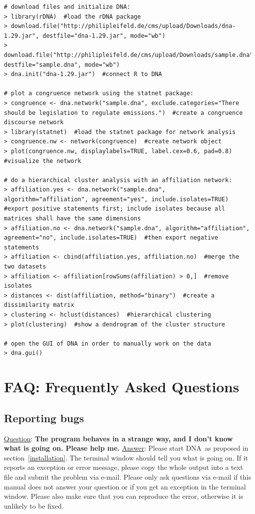 \documentclass[12pt,a4paper]{scrreprt}
\newcommand{\dnashort}{\textsc{DNA}}
\begin{document}
\begin{lstlisting}[breaklines=true,showstringspaces=false,frame=tlRB]
# download files and initialize DNA:
> library(rDNA)  #load the rDNA package
> download.file("http://philipleifeld.de/cms/upload/Downloads/dna-1.29.jar", destfile="dna-1.29.jar", mode="wb")
> download.file("http://philipleifeld.de/cms/upload/Downloads/sample.dna", destfile="sample.dna", mode="wb")
> dna.init("dna-1.29.jar")  #connect R to DNA

# plot a congruence network using the statnet package:
> congruence <- dna.network("sample.dna", exclude.categories="There should be legislation to regulate emissions.")  #create a congruence discourse network
> library(statnet)  #load the statnet package for network analysis
> congruence.nw <- network(congruence)  #create network object
> plot(congruence.nw, displaylabels=TRUE, label.cex=0.6, pad=0.8)  #visualize the network

# do a hierarchical cluster analysis with an affiliation network:
> affiliation.yes <- dna.network("sample.dna", algorithm="affiliation", agreement="yes", include.isolates=TRUE)  #export positive statements first; include isolates because all matrices shall have the same dimensions
> affiliation.no <- dna.network("sample.dna", algorithm="affiliation", agreement="no", include.isolates=TRUE)  #then export negative statements
> affiliation <- cbind(affiliation.yes, affiliation.no)  #merge the two datasets
> affiliation <- affiliation[rowSums(affiliation) > 0,]  #remove isolates
> distances <- dist(affiliation, method="binary")  #create a dissimilarity matrix
> clustering <- hclust(distances)  #hierarchical clustering
> plot(clustering)  #show a dendrogram of the cluster structure

# open the GUI of DNA in order to manually work on the data
> dna.gui()
\end{lstlisting}

\chapter{FAQ: Frequently Asked Questions}\label{faq}

\section{Reporting bugs}
\underline{Question}: \textbf{The program behaves in a strange way, and I don't know what is going on. Please help me.}
\vspace{0.3cm} \newline
\underline{Answer}: Please start \dnashort\ as proposed in section~\ref{installation}. The terminal window should tell you what is going on. If it reports an exception or error message, please copy the whole output into a text file and submit the problem via e-mail. Please only ask questions via e-mail if this manual does not answer your question or if you get an exception in the terminal window. Please also make sure that you can reproduce the error, otherwise it is unlikely to be fixed.
\end{document}
